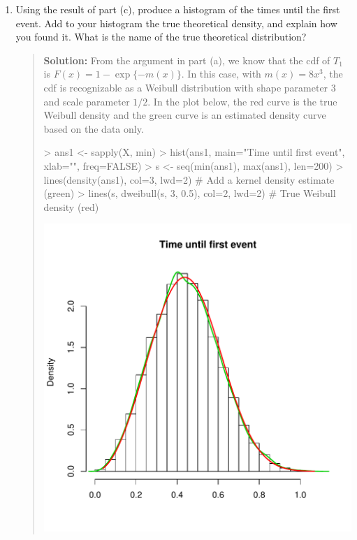 \documentclass{article}
\begin{document}
\begin{enumerate}
\begin{enumerate}
  \item Using the result of part (c), produce a histogram of the times until the
  first event. Add to your histogram the true theoretical density, and explain
  how you found it. What is the name of the true theoretical distribution?
  \begin{quotation}{\bf Solution:}
  From the argument in part (a), we know that the cdf of $T_1$ is
  $F(x) = 1- \exp\{-m(x)\}$.  In this case, with $m(x)=8x^3$,
  the cdf is recognizable as a Weibull distribution with shape parameter
  $3$ and scale parameter $1/2$.
  In the plot below, the red curve is the true Weibull density and the green curve
  is an estimated density curve based on the data only.
\begin{Schunk}
\begin{Sinput}
> ans1 <- sapply(X, min)
> hist(ans1, main="Time until first event", xlab="", freq=FALSE)
> s <- seq(min(ans1), max(ans1), len=200)
> lines(density(ans1), col=3, lwd=2) # Add a kernel density estimate (green)
> lines(s, dweibull(s, 3, 0.5), col=2, lwd=2) # True Weibull density (red)
\end{Sinput}
\end{Schunk}
\includegraphics{sol06-003}
  \end{quotation}

  \end{enumerate}  


\end{enumerate}
\end{document}
